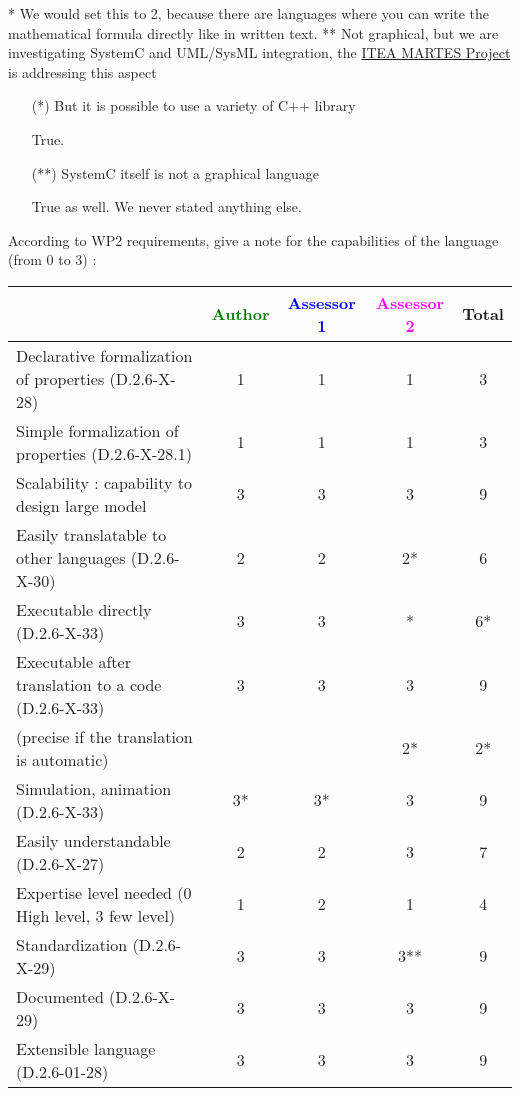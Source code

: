\begin{author_comment}
* We would set this to 2, because there are languages where you can write the mathematical formula directly like in written text.
** Not graphical, but we are investigating SystemC and UML/SysML integration, the \href{http://www.martes-idea.org/}{ITEA MARTES Project} is addressing this aspect
\end{author_comment}
\begin{assessor1}
\begin{itemize}
\item[(*)] But it is possible to use a variety of C++ library
\begin{author_comment}
True.
\end{author_comment}
\item[(**)] SystemC itself is not a graphical language
\begin{author_comment}
True as well. We never stated anything else.
\end{author_comment}
\end{itemize}
\end{assessor1}

According to WP2 requirements, give a note for the capabilities of the language (from 0 to 3) :

\begin{tabular}{|l | c | c | c | c|}
  \hline
  & \textcolor{green}{Author} & \textcolor{blue}{Assessor 1} & \textcolor{magenta}{Assessor 2} & Total \\
  \hline
  Declarative formalization of properties (D.2.6-X-28) &1 &1 & 1& 3 \\
  \hline
  Simple formalization of properties (D.2.6-X-28.1) &1 &1 &1 & 3 \\
  \hline
  Scalability : capability to design large model &3 &3 & 3 & 9 \\
  \hline
  Easily translatable to other languages (D.2.6-X-30) & 2 & 2  & 2* & 6 \\
  \hline
  Executable directly (D.2.6-X-33) &3 & 3  & * & 6* \\
  \hline
  Executable after translation to a code (D.2.6-X-33) &3 &3 &3 & 9 \\
  (precise if the translation is automatic) & & & 2*& 2*\\
  \hline
  Simulation, animation (D.2.6-X-33) &3* &3* &3 & 9 \\
  \hline
  Easily understandable (D.2.6-X-27) &2 &2 &3 & 7 \\
  \hline
  Expertise level needed (0 High level, 3 few level) &1 &2 &1 & 4 \\
  \hline
  Standardization (D.2.6-X-29) &3 &3 &3** & 9 \\
  \hline
  Documented (D.2.6-X-29) &3 &3 &3 & 9 \\
  \hline
  Extensible language (D.2.6-01-28) &3 &3 &3 & 9 \\
  \hline
\end{tabular}

